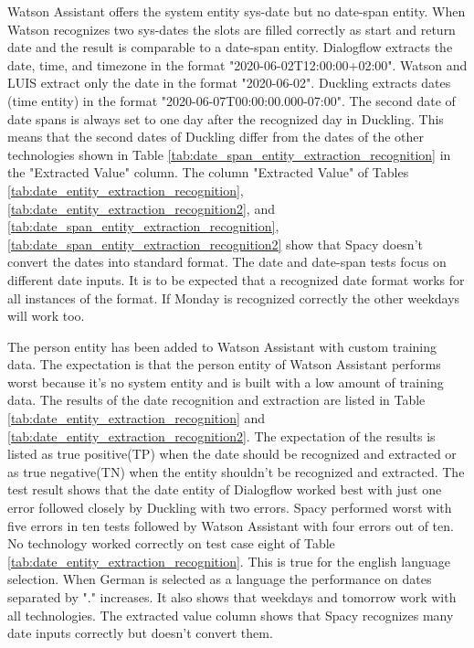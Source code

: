 Watson Assistant offers the system entity sys-date but no date-span entity.
When Watson recognizes two sys-dates the slots are filled correctly as start and return date
and the result is comparable to a date-span entity.
Dialogflow extracts the date, time, and timezone in the format "2020-06-02T12:00:00+02:00".
Watson and LUIS extract only the date in the format "2020-06-02".
Duckling extracts dates (time entity) in the format "2020-06-07T00:00:00.000-07:00".
The second date of date spans is always set to one day after the recognized day in Duckling.
This means that the second dates of Duckling differ from the dates of the other technologies
shown in Table \ref{tab:date_span_entity_extraction_recognition} in the "Extracted Value" column.
The column "Extracted Value" of Tables \ref{tab:date_entity_extraction_recognition},
\ref{tab:date_entity_extraction_recognition2},
and \ref{tab:date_span_entity_extraction_recognition},
\ref{tab:date_span_entity_extraction_recognition2} show that Spacy doesn't 
convert the dates into standard format.
The date and date-span tests focus on different date inputs.
It is to be expected that a recognized date format works for 
all instances of the format.
If Monday is recognized correctly the other weekdays will work too. 

The person entity has been added to Watson Assistant with custom training data.
The expectation is that the person entity of Watson Assistant performs worst because 
it's no system entity and is built with a low amount of training data.
The results of the date recognition and extraction are listed in Table \ref{tab:date_entity_extraction_recognition}
and \ref{tab:date_entity_extraction_recognition2}.
The expectation of the results is listed as true positive(TP) when the date should be recognized and extracted or as true negative(TN)
when the entity shouldn't be recognized and extracted.
The test result shows that the date entity of Dialogflow worked best with just one error
followed closely by Duckling with two errors.
Spacy performed worst with five errors in ten tests followed by Watson Assistant with four errors out of ten.
No technology worked correctly on test case eight of Table \ref{tab:date_entity_extraction_recognition}.
This is true for the english language selection.
When German is selected as a language the performance on dates separated by
"." increases.
It also shows that weekdays and tomorrow work with all technologies.
The extracted value column shows that Spacy recognizes many date inputs correctly but doesn't convert them.

